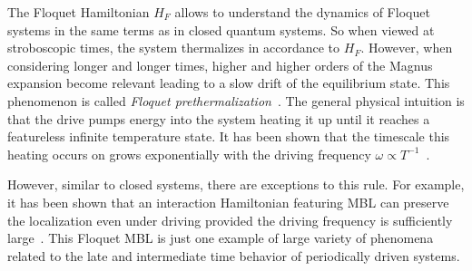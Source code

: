 The Floquet Hamiltonian $H_F$ allows to understand the dynamics of Floquet systems in the same terms as in closed quantum systems. So when viewed at stroboscopic times, the system thermalizes in accordance to $H_F$. 
However, when considering longer and longer times, higher and higher orders of the Magnus expansion become relevant leading to a slow drift of the equilibrium state. This phenomenon is called \emph{Floquet prethermalization}~\cite{moriThermalizationPrethermalizationIsolated2018}.
The general physical intuition is that the drive pumps energy into the system heating it up until it reaches a featureless infinite temperature state\cite{dalessioLongtimeBehaviorIsolated2014,bukovUniversalHighfrequencyBehavior2015}. It has been shown that the timescale this heating occurs on grows exponentially with the driving frequency $\omega\propto T^{-1}$~\cite{kuwaharaFloquetMagnusTheory2016,abaninRigorousTheoryManyBody2017}.

However, similar to closed systems, there are exceptions to this rule.
For example, it has been shown that an interaction Hamiltonian featuring MBL can preserve the localization even under driving provided the driving frequency is sufficiently large~\cite{abaninTheoryManybodyLocalization2016,burauFateAlgebraicManybody2021,sierantStabilityManybodyLocalization2023}.
This Floquet MBL is just one example of large variety of phenomena related to the late and intermediate time behavior of periodically driven systems.  

